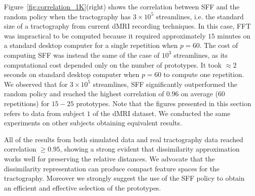 Figure~\ref{fig:correlation_1K}(right) shows the correlation between SFF and the random policy when the tractography has $3\times 10^5$ streamlines, i.e. the standard size of a tractography from current dMRI recording techniques. In this case, FFT was impractical to be computed because it required approximately $15$ minutes on a standard desktop computer for a single repetition when $p=60$. The cost of computing SFF was instead the same of the case of $10^3$ streamlines, as its computational cost depended only on the number of prototypes. It took $\approx 2$ seconds on standard desktop computer when $p=60$ to compute one repetition. We observed that for $3\times 10^5$ streamlines, SFF significantly outperformed the random policy and reached the highest correlation of $0.96$ on average ($60$ repetitions) for $15-25$ prototypes. Note that the figures presented in this section refers to data from subject $1$ of the dMRI dataset. We conducted the same experiments on other subjects obtaining equivalent results. 

All of the results from both simulated data and real tractography data reached correlation $\geq 0.95$, showing a strong evident that dissimilarity approximation works well for preserving the relative distances. We advocate that the dissimilarity representation can produce compact feature spaces for the tractography. Moreover we strongly suggest the use of the SFF policy to obtain an efficient and effective selection of the prototypes.
